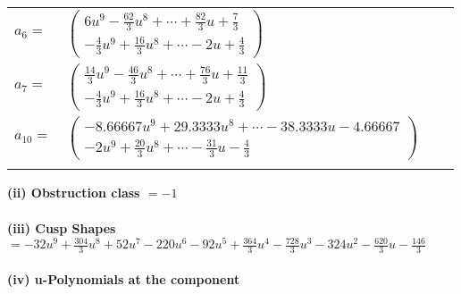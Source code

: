 \documentclass[1p]{elsarticle_modified}
\theoremstyle{definition}
\begin{document}
\begin{tabular}{m{7pt} m{180pt} m{7pt} m{180pt} }
\flushright $a_{6}=$&$\begin{pmatrix}6 u^9-\frac{62}{3} u^8+\cdots+\frac{82}{3} u+\frac{7}{3}\\-\frac{4}{3} u^9+\frac{16}{3} u^8+\cdots-2 u+\frac{4}{3}\end{pmatrix}$ \\
\flushright $a_{7}=$&$\begin{pmatrix}\frac{14}{3} u^9-\frac{46}{3} u^8+\cdots+\frac{76}{3} u+\frac{11}{3}\\-\frac{4}{3} u^9+\frac{16}{3} u^8+\cdots-2 u+\frac{4}{3}\end{pmatrix}$ \\
\flushright $a_{10}=$&$\begin{pmatrix}-8.66667 u^{9}+29.3333 u^{8}+\cdots-38.3333 u-4.66667\\-2 u^9+\frac{20}{3} u^8+\cdots-\frac{31}{3} u-\frac{4}{3}\end{pmatrix}$\\&\end{tabular}
\flushleft \textbf{(ii) Obstruction class $= -1$}\\~\\
\flushleft \textbf{(iii) Cusp Shapes $= -32 u^9+\frac{304}{3} u^8+52 u^7-220 u^6-92 u^5+\frac{364}{3} u^4-\frac{728}{3} u^3-324 u^2-\frac{620}{3} u-\frac{146}{3}$}\\~\\
\newpage\renewcommand{\arraystretch}{1}
\flushleft \textbf{(iv) u-Polynomials at the component}\newline \\
\end{document}
